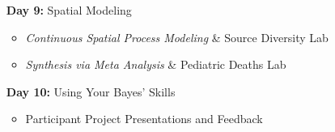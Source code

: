 \documentclass[11pt]{article}
\begin{document}
\begin{enumerate}
\item[\textbf{Day 9:}] Spatial Modeling

\begin{itemize}
\item \emph{Continuous Spatial Process Modeling} \& Source Diversity Lab %
\item \emph{Synthesis via Meta Analysis} \& Pediatric Deaths Lab %
\end{itemize}

\item[\textbf{Day 10:}] Using Your Bayes' Skills

\begin{itemize}
\item Participant Project Presentations and Feedback 
\end{itemize}

\end{enumerate}
\end{document}
